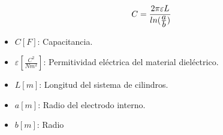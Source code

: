 \[
C = \frac{2 \pi \varepsilon L}{ln({\displaystyle a\over\displaystyle b})}
\]
\begin{itemize}
    \item $C[F]$: Capacitancia.
    \item $\varepsilon [\frac{C^2}{Nm^2}]$: Permitividad eléctrica del material dieléctrico.
    \item $L[m]$: Longitud del sistema de cilindros.
    \item $a[m]$: Radio del electrodo interno.
    \item $b[m]$: Radio
\end{itemize}
